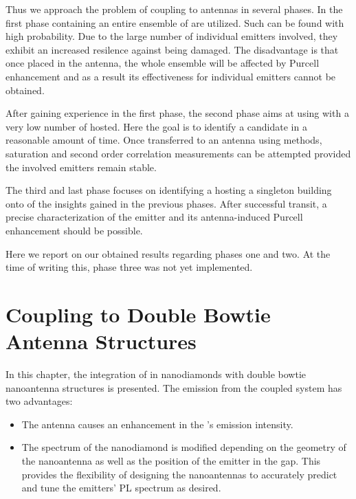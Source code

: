 		Thus we approach the problem of coupling \sivs to antennas in several phases. In the first phase \nds containing an entire ensemble of \sivs are utilized. Such \nds can be found with high probability. Due to the large number of individual emitters involved, they exhibit an increased resilence against being damaged. The disadvantage is that once placed in the antenna, the whole ensemble will be affected by Purcell enhancement and as a result its effectiveness for individual emitters cannot be obtained.

		After gaining experience in the first phase, the second phase aims at using \nds with a very low number of \sivs hosted. Here the goal is to identify a candidate \nd in a reasonable amount of time. Once transferred to an antenna using \pp methods, saturation and second order correlation measurements can be attempted provided the involved emitters remain stable.

		The third and last phase focuses on identifying a \nd hosting a singleton \siv building onto of the insights gained in the previous phases. After successful \pp transit, a precise characterization of the emitter and its antenna-induced Purcell enhancement should be possible.

		Here we report on our obtained results regarding phases one and two. At the time of writing this, phase three was not yet implemented.

\section[Antennas]{Coupling \Nds to Double Bowtie Antenna Structures} \label{sec::coupling_antennas}

	In this chapter, the integration of \sivs in nanodiamonds with double bowtie nanoantenna structures is presented.
	The emission from the coupled system has two advantages:
	\begin{itemize}
		\item The antenna causes an enhancement in the \siv{}'s \pl emission intensity.
		\item The \pl spectrum of the nanodiamond is modified depending on the geometry of the nanoantenna as well as the position of the emitter in the gap. This provides the flexibility of designing the nanoantennas to accurately predict and tune the emitters' PL spectrum as desired.
	\end{itemize}


